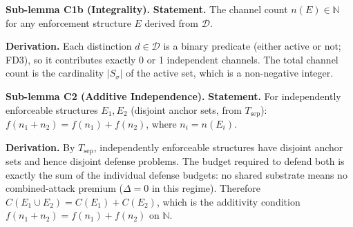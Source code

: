 \documentclass[11pt]{article}
\theoremstyle{remark}
\begin{document}
\medskip\noindent\textbf{Sub-lemma C1b (Integrality).}
\textbf{Statement.}  The channel count $n(E) \in \mathbb{N}$ for any enforcement structure $E$ derived from $\mathcal{D}$.

\smallskip\noindent\textbf{Derivation.}  Each distinction $d \in \mathcal{D}$ is a binary predicate (either active or not; FD3), so it contributes exactly 0 or 1 independent channels.  The total channel count is the cardinality $|S_\sigma|$ of the active set, which is a non-negative integer.



\medskip\noindent\textbf{Sub-lemma C2 (Additive Independence).}
\textbf{Statement.}  For independently enforceable structures $E_1, E_2$ (disjoint anchor sets, from $T_{\mathrm{sep}}$): $f(n_1 + n_2) = f(n_1) + f(n_2)$, where $n_i = n(E_i)$.

\smallskip\noindent\textbf{Derivation.}  By $T_{\mathrm{sep}}$, independently enforceable structures have disjoint anchor sets and hence disjoint defense problems.  The budget required to defend both is exactly the sum of the individual defense budgets: no shared substrate means no combined-attack premium ($\Delta = 0$ in this regime).  Therefore $C(E_1 \cup E_2) = C(E_1) + C(E_2)$, which is the additivity condition $f(n_1 + n_2) = f(n_1) + f(n_2)$ on $\mathbb{N}$.
\end{document}
